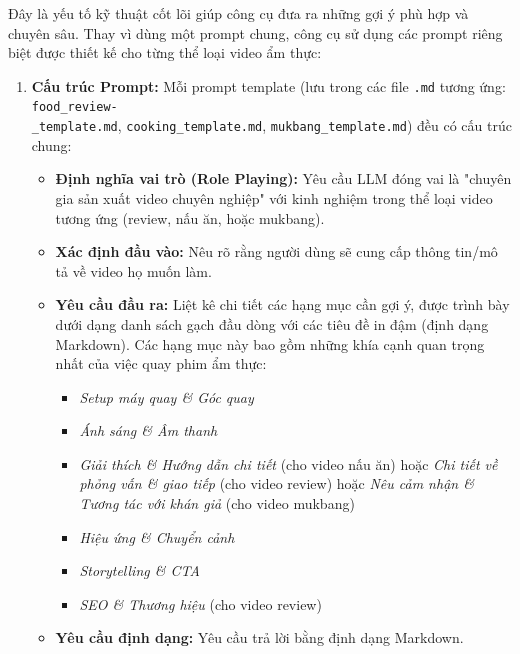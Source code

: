 Đây là yếu tố kỹ thuật cốt lõi giúp công cụ đưa ra những gợi ý phù hợp và chuyên sâu. Thay vì dùng một prompt chung, công cụ sử dụng các prompt riêng biệt được thiết kế cho từng thể loại video ẩm thực:
\begin{enumerate}
    \item \textbf{Cấu trúc Prompt:} Mỗi prompt template (lưu trong các file \texttt{.md} tương ứng: \texttt{food\_review-\\\_template.md}, \texttt{cooking\_template.md}, \texttt{mukbang\_template.md}) đều có cấu trúc chung:
    \begin{itemize}
        \item \textbf{Định nghĩa vai trò (Role Playing):} Yêu cầu LLM đóng vai là "chuyên gia sản xuất video chuyên nghiệp" với kinh nghiệm trong thể loại video tương ứng (review, nấu ăn, hoặc mukbang).

        \item \textbf{Xác định đầu vào:} Nêu rõ rằng người dùng sẽ cung cấp thông tin/mô tả về video họ muốn làm.
        
        \item \textbf{Yêu cầu đầu ra:} Liệt kê chi tiết các hạng mục cần gợi ý, được trình bày dưới dạng danh sách gạch đầu dòng với các tiêu đề in đậm (định dạng Markdown). Các hạng mục này bao gồm những khía cạnh quan trọng nhất của việc quay phim ẩm thực:
        \begin{itemize}
            \item \textit{Setup máy quay \& Góc quay}

            \item \textit{Ánh sáng \& Âm thanh}
            
            \item \textit{Giải thích \& Hướng dẫn chi tiết} (cho video nấu ăn) hoặc \textit{Chi tiết về phỏng vấn \& giao tiếp} (cho video review) hoặc \textit{Nêu cảm nhận \& Tương tác với khán giả} (cho video mukbang)
            
            \item \textit{Hiệu ứng \& Chuyển cảnh}
            
            \item \textit{Storytelling \& CTA}
            
            \item \textit{SEO \& Thương hiệu} (cho video review)
        \end{itemize}

        \item \textbf{Yêu cầu định dạng:} Yêu cầu trả lời bằng định dạng Markdown.
    \end{itemize}


\end{enumerate}
